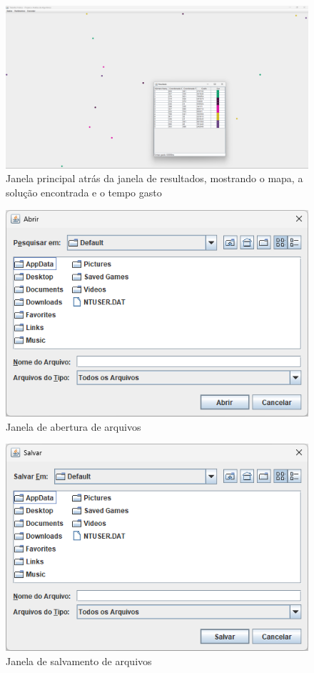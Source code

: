 \documentclass[12pt]{article}
\begin{document}
\begin{figure}
    \centering
    \includegraphics[width=\textwidth]{Captura de tela 2024-06-01 110931}
    \caption{Janela principal atrás da janela de resultados, mostrando o mapa, a solução encontrada e o tempo gasto}
    \label{fig:fig-5}
\end{figure}

\begin{figure}
    \centering
    \includegraphics[width=\textwidth]{Captura de tela 2024-06-01 111051}
    \caption{Janela de abertura de arquivos}
    \label{fig:fig-6}
\end{figure}

\begin{figure}
    \centering
    \includegraphics[width=\textwidth]{Captura de tela 2024-06-01 111107}
    \caption{Janela de salvamento de arquivos}
    \label{fig:fig-7}
\end{figure}
\end{document}
